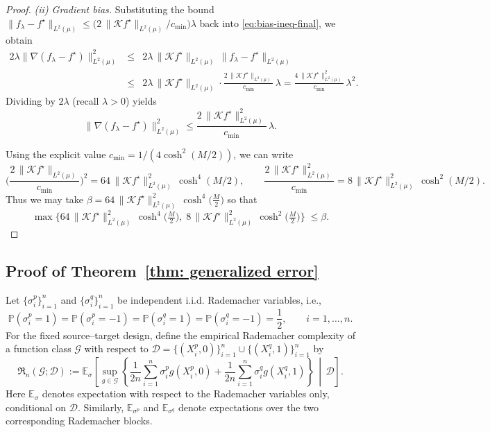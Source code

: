 \documentclass[11pt]{article}
\newcommand{\PP}{\mathbb{P}}
\theoremstyle{plain}
\theoremstyle{definition}
\theoremstyle{remark}
\begin{document}
\begin{proof}
\smallskip\noindent
\emph{(ii) Gradient bias.}
Substituting the bound
$\|f_\lambda-f^\star\|_{L^2(\mu)}
   \le \big(2\,\|\mathcal K f^\star\|_{L^2(\mu)}/c_{\min}\big)\lambda$
back into \eqref{eq:bias-ineq-final}, we obtain
\begin{eqnarray*}
     2\lambda\|\nabla(f_\lambda-f^\star)\|_{L^2(\mu)}^2
  &\le&
  2\lambda \,\|\mathcal K f^\star\|_{L^2(\mu)}\,\|f_\lambda-f^\star\|_{L^2(\mu)}\\
 & \le&
  2\lambda \,\|\mathcal K f^\star\|_{L^2(\mu)}\cdot
  \frac{2\,\|\mathcal K f^\star\|_{L^2(\mu)}}{c_{\min}}\,\lambda
  = \frac{4\,\|\mathcal K f^\star\|_{L^2(\mu)}^2}{c_{\min}}\,\lambda^2.
\end{eqnarray*}
Dividing by $2\lambda$ (recall $\lambda>0$) yields
\begin{equation}
  \|\nabla(f_\lambda-f^\star)\|_{L^2(\mu)}^2
  \le \frac{2\,\|\mathcal K f^\star\|_{L^2(\mu)}^2}{c_{\min}}\,\lambda.
  \label{eq:bias-gradient}
\end{equation}

Using the explicit value \(c_{\min}=1/(4\cosh^2(M/2))\), we can write
\[
  \Big(\frac{2\,\|\mathcal K f^\star\|_{L^2(\mu)}}{c_{\min}}\Big)^2
  = 64\,\|\mathcal K f^\star\|_{L^2(\mu)}^2\,\cosh^4(M/2),
  \qquad
  \frac{2\,\|\mathcal K f^\star\|_{L^2(\mu)}^2}{c_{\min}}
  = 8\,\|\mathcal K f^\star\|_{L^2(\mu)}^2\,\cosh^2(M/2).
\]
Thus we may take
$\beta = 64\,\|\mathcal K f^\star\|_{L^2(\mu)}^2\,\cosh^4\!\big(\tfrac{M}{2}\big)$ so that
\[
  \max\Big\{
        64\,\|\mathcal K f^\star\|_{L^2(\mu)}^2\,\cosh^4\!\big(\tfrac{M}{2}\big),\;
        8\,\|\mathcal K f^\star\|_{L^2(\mu)}^2\,\cosh^2\!\big(\tfrac{M}{2}\big)
      \Big\}
  \;\le\beta.
\]

\end{proof}
\subsection{Proof of Theorem~\ref{thm: generalized error}}
\label{sec: proof of generalzied error}


Let \(\{\sigma_i^p\}_{i=1}^n\) and \(\{\sigma_i^q\}_{i=1}^n\) be independent
i.i.d. Rademacher variables, i.e.,
\[
\PP(\sigma_i^p=1)=\PP(\sigma_i^p=-1)
=\PP(\sigma_i^q=1)=\PP(\sigma_i^q=-1)=\frac12,
\qquad i=1,\ldots,n.
\]
For the fixed source--target design, define the
empirical Rademacher complexity of a function class \(\mathcal G\) with respect to
\(\mathcal D=\{(X_i^p,0)\}_{i=1}^n\cup\{(X_i^q,1)\}_{i=1}^n\) by
\[
\mathfrak R_n(\mathcal G;\mathcal D):=
\mathbb E_\sigma
\left[
\sup_{g\in\mathcal G}
\left\{
\frac{1}{2n}\sum_{i=1}^{n}\sigma_i^p g(X_i^p,0)
+
\frac{1}{2n}\sum_{i=1}^{n}\sigma_i^q g(X_i^q,1)
\right\}
\,\middle|\,\mathcal D
\right].
\]
Here \(\mathbb E_\sigma\) denotes expectation with respect to the Rademacher
variables only, conditional on \(\mathcal D\). Similarly,
\(\mathbb E_{\sigma^p}\) and \(\mathbb E_{\sigma^q}\) denote expectations
over the two corresponding Rademacher blocks.
\end{document}
